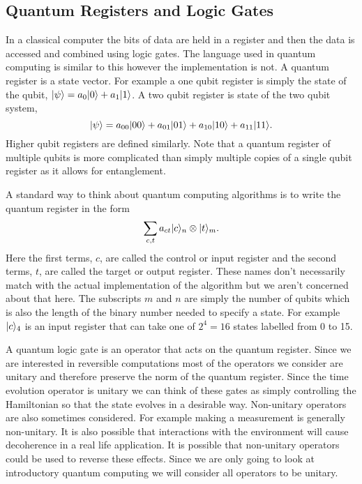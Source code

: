    \subsection{Quantum Registers and Logic Gates}
    In a classical computer the bits of data are held in a register and then the data is accessed and combined using logic gates.
    The language used in quantum computing is similar to this however the implementation is not.
    A quantum register is a state vector.
    For example a one qubit register is simply the state of the qubit, \(\vert {\psi} \rangle = a_0\vert {0} \rangle + a_1\vert {1} \rangle\).
    A two qubit register is state of the two qubit system,
    \[\vert {\psi} \rangle = a_{00}\vert {00} \rangle + a_{01}\vert {01} \rangle + a_{10}\vert {10} \rangle + a_{11}\vert {11} \rangle.\]
    Higher qubit registers are defined similarly.
    Note that a quantum register of multiple qubits is more complicated than simply multiple copies of a single qubit register as it allows for entanglement.
    
    A standard way to think about quantum computing algorithms is to write the quantum register in the form
    \[\sum_{c, t}a_{ct}\vert {c} \rangle_n\otimes\vert {t} \rangle_m.\]
    Here the first terms, \(c\), are called the control or input register and the second terms, \(t\), are called the target or output register.
    These names don't necessarily match with the actual implementation of the algorithm but we aren't concerned about that here.
    The subscripts \(m\) and \(n\) are simply the number of qubits which is also the length of the binary number needed to specify a state.
    For example \(\vert {c} \rangle_4\) is an input register that can take one of \(2^4 = 16\) states labelled from 0 to 15.
    
    A quantum logic gate is an operator that acts on the quantum register.
    Since we are interested in reversible computations most of the operators we consider are unitary and therefore preserve the norm of the quantum register.
    Since the time evolution operator is unitary we can think of these gates as simply controlling the Hamiltonian so that the state evolves in a desirable way.
    Non-unitary operators are also sometimes considered.
    For example making a measurement is generally non-unitary.
    It is also possible that interactions with the environment will cause decoherence in a real life application.
    It is possible that non-unitary operators could be used to reverse these effects.
    Since we are only going to look at introductory quantum computing we will consider all operators to be unitary.
    
